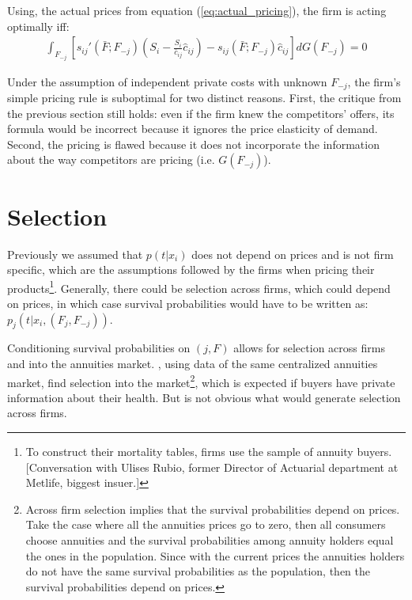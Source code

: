 \documentclass[12pt]{article}
\theoremstyle{plain}
\theoremstyle{plain}
\begin{document}
Using, the actual prices from equation (\ref{eq:actual_pricing}), the firm is acting optimally iff: 
\begin{align}\label{eq:comparison2}
    \int_{F_{-j}} \left[s_{ij}'(\bar{F}; F_{-j}) \left(S_{i}-\frac{S_{i}}{\bar{c}_{ij}}\hat{c}_{ij}\right)- s_{ij}(\bar{F}; F_{-j}) \hat{c}_{ij}  \right]dG(F_{-j})=0
\end{align}   
 
 
Under the assumption of independent private  costs with unknown $F_{-j}$, the firm's simple pricing rule is suboptimal for two distinct reasons. First, the critique from the previous section still holds: even if the firm knew the competitors' offers, its formula would be incorrect because it  ignores the price elasticity of demand. Second, the pricing is flawed because it does not incorporate the information about the way competitors are pricing (i.e. $G(F_{-j})$). 



 
 


\section{Selection}\label{sec:suboptimality2}



Previously we assumed that $p(t|x_{i})$ does not depend on prices and is not firm specific, which are the assumptions followed by the firms when pricing their products\footnote{To construct their mortality tables, firms use the sample of annuity buyers. [Conversation with Ulises Rubio, former Director of Actuarial department at Metlife, biggest insuer.] }. Generally, there could be selection across firms, which could depend on prices, in which case survival probabilities would have to be written as: $p_j(t|x_{i}, (F_j, F_{-j}))$. 

Conditioning survival probabilities on $(j, F)$  allows for selection across firms and into the annuities market. \textcite{illanes_retirement_2019}, using data of the same centralized annuities market, find selection into the market\footnote{Across firm selection implies that the survival probabilities depend on prices. Take the case where all the annuities prices go to zero, then all consumers choose annuities and the survival probabilities among annuity holders equal the ones in the population. Since with the current prices the annuities holders do not have the same survival probabilities as the population, then the survival probabilities depend on prices.}, which is expected if buyers have private information about their health. But is not obvious what would generate selection across firms. 
\end{document}
